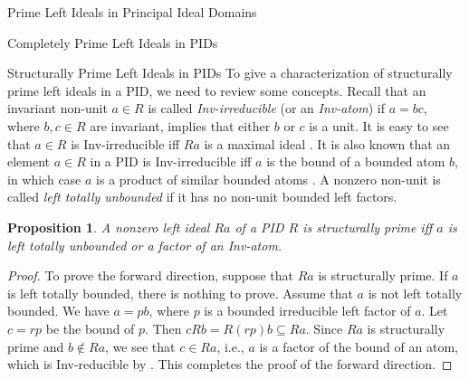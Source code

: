 \documentclass[11pt,a4paper]{article}
\theoremstyle{theorem}
\newtheorem{proposition}[theorem]{Proposition}
\numberwithin{equation}{section}
\begin{document}
\begin{section}{Prime Left Ideals in Principal Ideal Domains}
\begin{subsection}{Completely Prime Left Ideals in PIDs }
	\end{subsection}
	\begin{subsection}{Structurally Prime Left Ideals in PIDs}		
		To give a characterization of structurally prime left ideals in a PID, we need to review some concepts. Recall that an invariant non-unit \(a\in R\) is called \textit{Inv-irreducible} (or an \textit{Inv-atom}) if \(a = bc\), where \(b,c\in R\) are invariant, implies that either \(b\) or  \(c\) is a unit. It is easy to see that \(a\in R\) is Inv-irreducible iff \(Ra\) is  a maximal ideal \cite[Theorem 6.2.4 (i)]{cohn2006free}. It is also known that an element \(a\in R\)  in a PID is Inv-irreducible iff \(a\) is the bound of a bounded atom \(b\), in which case \(a\) is a product of similar bounded atoms \cite[Theorem 6.2.4 (ii), (iii)]{cohn2006free}.  A nonzero non-unit is called \textit{left totally unbounded} if it has no non-unit bounded left factors. 
		\begin{proposition}\label{prop: structurally prime ideal of PID}
			A nonzero left ideal \(Ra\) of a PID \(R \) is  structurally prime iff  \( a \) is  left totally unbounded or a factor of an Inv-atom.
		\end{proposition}
		\begin{proof}
			To prove the forward direction, suppose that \(Ra\) is structurally prime. If \(a\) is left totally bounded, there is nothing to prove. Assume that \(a\) is not left totally bounded. We have \(a = pb\), where \(p\) is a bounded irreducible left factor of \(a\). Let \(c = rp\) be the bound of \(p\). Then \(cRb=R(rp)b\subseteq Ra\). Since \(Ra\) is structurally prime and \(b\notin Ra\), we see that \(c\in Ra\), i.e., \(a\) is a factor of the bound of an atom, which is Inv-reducible by \cite[Theorem 6.2.4 (iii)]{cohn2006free}. This completes the proof of the forward direction.    
		

\end{proof}
\end{subsection}
\end{section}
\end{document}
